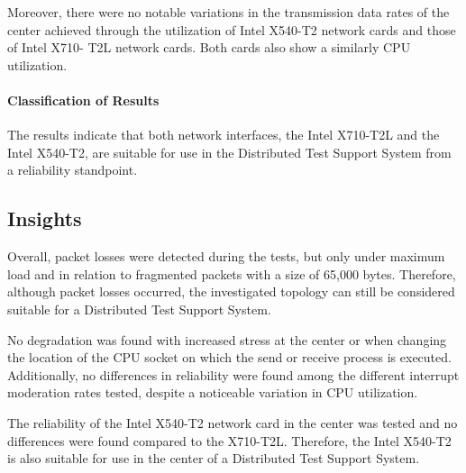 Moreover, there were no notable variations in the transmission data rates of the center achieved through the utilization of Intel X540-T2 network cards and those of Intel X710- T2L network cards. Both cards also show a similarly CPU utilization.

\paragraph{Classification of Results}
The results indicate that both network interfaces, the Intel X710-T2L and the Intel X540-T2, are suitable for use in the Distributed Test Support System from a reliability standpoint. 

\subsection{Insights}
Overall, packet losses were detected during the tests, but only under maximum load and in relation to fragmented packets with a size of 65,000 bytes. Therefore, although packet losses occurred, the investigated topology can still be considered suitable for a Distributed Test Support System.

No degradation was found with increased stress at the center or when changing the location of the CPU socket on which the send or receive process is executed. Additionally, no differences in reliability were found among the different interrupt moderation rates tested, despite a noticeable variation in CPU utilization.

The reliability of the Intel X540-T2 network card in the center was tested and no differences were found compared to the X710-T2L. Therefore, the Intel X540-T2 is also suitable for use in the center of a Distributed Test Support System.








